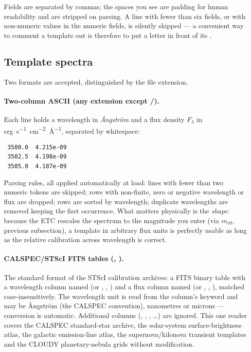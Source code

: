 Fields are separated by commas; the spaces you see are padding for human
readability and are stripped on parsing. A line with fewer than six
fields, or with non-numeric values in the numeric fields, is silently
skipped --- a convenient way to comment a template out is therefore to
put a letter in front of its .

\subsection{Template spectra}
\label{sec:file-templates}

Two formats are accepted, distinguished by the file extension.

\paragraph{Two-column ASCII (any extension except /).}
Each line holds a wavelength in \emph{\AA{}ngstr\"om} and a flux density
$F_\lambda$ in \si{erg.s^{-1}.cm^{-2}.\angstrom^{-1}}, separated by
whitespace:

\begin{verbatim}
 3500.0  4.215e-09
 3502.5  4.198e-09
 3505.0  4.187e-09
\end{verbatim}

Parsing rules, all applied automatically at load: lines with fewer than
two numeric tokens are skipped; rows with non-finite, zero or negative
wavelength or flux are dropped; rows are sorted by wavelength; duplicate
wavelengths are removed keeping the first occurrence. What matters
physically is the \emph{shape}: because the ETC rescales the spectrum to
the magnitude you enter (via $m_{v0}$, previous subsection), a template in
arbitrary flux units is perfectly usable as long as the relative
calibration across wavelength is correct.

\paragraph{CALSPEC/STScI FITS tables (, ).}
The standard format of the STScI calibration archives: a FITS binary
table with a wavelength column named  (or ,
, ) and a flux column named  (or
, , ), matched case-insensitively.
The wavelength unit is read from the column's  keyword and may
be \AA{}ngstr\"om (the CALSPEC convention), nanometres or microns ---
conversion is automatic. Additional columns (,
, , \dots) are ignored. This one reader covers
the CALSPEC standard-star archive, the solar-system surface-brightness
atlas, the galactic emission-line atlas, the supernova/kilonova transient
templates and the CLOUDY planetary-nebula grids without modification.

